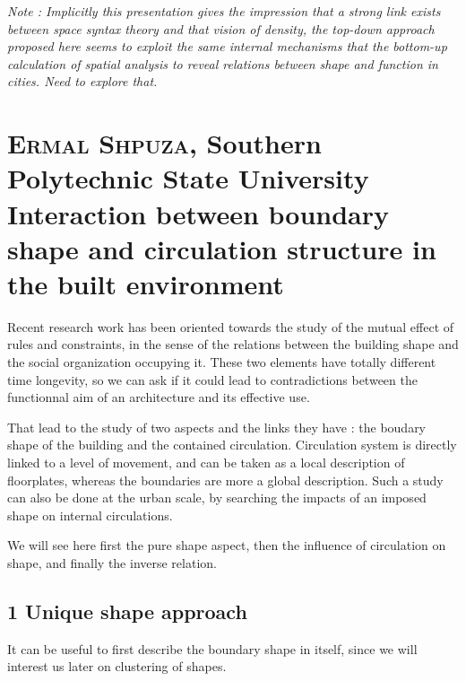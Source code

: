 \documentclass[english]{article}
\newcommand{\noun}[1]{\textsc{#1}}
\begin{document}
\textit{Note : Implicitly this presentation gives the impression that
a strong link exists between space syntax theory and that vision of
density, the top-down approach proposed here seems to exploit the
same internal mechanisms that the bottom-up calculation of spatial
analysis to reveal relations between shape and function in cities.
Need to explore that.}

\newpage{}


\section*{\noun{Ermal Shpuza}, Southern Polytechnic State University\protect \\
Interaction between boundary shape and circulation structure in the
built environment}

Recent research work has been oriented towards the study of the mutual
effect of rules and constraints, in the sense of the relations between
the building shape and the social organization occupying it. These
two elements have totally different time longevity, so we can ask
if it could lead to contradictions between the functionnal aim of
an architecture and its effective use.

\bigskip{}


That lead to the study of two aspects and the links they have : the
boudary shape of the building and the contained circulation. Circulation
system is directly linked to a level of movement, and can be taken
as a local description of floorplates, whereas the boundaries are
more a global description. Such a study can also be done at the urban
scale, by searching the impacts of an imposed shape on internal circulations.

\bigskip{}


We will see here first the pure shape aspect, then the influence of
circulation on shape, and finally the inverse relation.


\subsection*{1 Unique shape approach}

It can be useful to first describe the boundary shape in itself, since
we will interest us later on clustering of shapes.

\bigskip{}
\end{document}
